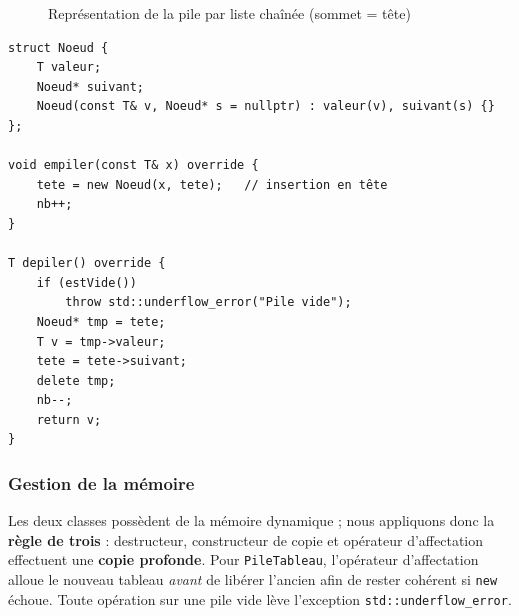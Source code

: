 \documentclass[11pt,a4paper]{article}
\newcommand{\code}[1]{\texttt{#1}}
\begin{document}
\begin{figure}[H]
\centering
{}
\caption{Représentation de la pile par liste chaînée (sommet = tête)}
\end{figure}

\begin{lstlisting}[caption={Structure et méthodes essentielles de \code{PileListe<T>}}]
struct Noeud {
    T valeur;
    Noeud* suivant;
    Noeud(const T& v, Noeud* s = nullptr) : valeur(v), suivant(s) {}
};

void empiler(const T& x) override {
    tete = new Noeud(x, tete);   // insertion en tête
    nb++;
}

T depiler() override {
    if (estVide())
        throw std::underflow_error("Pile vide");
    Noeud* tmp = tete;
    T v = tmp->valeur;
    tete = tete->suivant;
    delete tmp;
    nb--;
    return v;
}
\end{lstlisting}

\subsubsection{Gestion de la mémoire}

Les deux classes possèdent de la mémoire dynamique ; nous appliquons donc la
\textbf{règle de trois} : destructeur, constructeur de copie et opérateur
d'affectation effectuent une \textbf{copie profonde}. Pour
\code{PileTableau}, l'opérateur d'affectation alloue le nouveau tableau
\emph{avant} de libérer l'ancien afin de rester cohérent si \code{new}
échoue. Toute opération sur une pile vide lève l'exception
\code{std::underflow\_error}.
\end{document}

